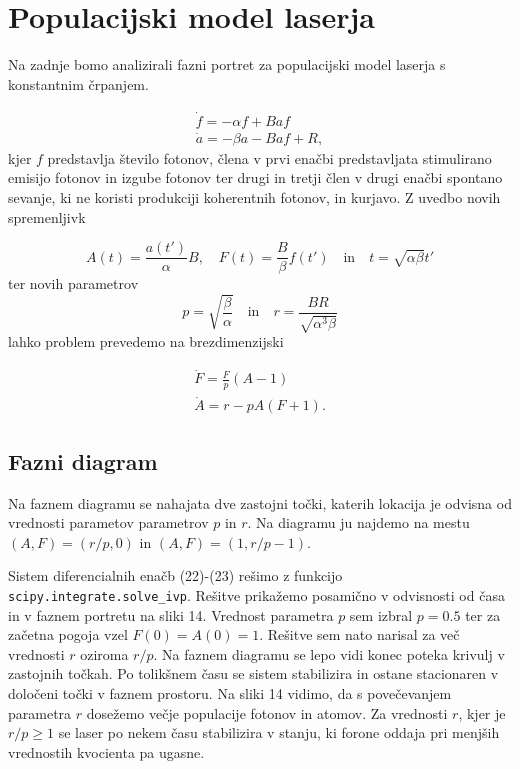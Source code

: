 \documentclass[slovene,11pt,a4paper]{article}
\begin{document}
\section{Populacijski model laserja}

Na zadnje bomo analizirali fazni portret za populacijski model laserja s konstantnim črpanjem.

\begin{align}
\dot{f} = -\alpha f + B af \\
\dot{a} = -\beta a - B af + R,
\end{align}
kjer $f$ predstavlja število fotonov, člena v prvi enačbi predstavljata stimulirano emisijo fotonov in izgube fotonov ter drugi in tretji člen v drugi enačbi spontano sevanje, ki ne koristi produkciji koherentnih fotonov, in kurjavo. Z uvedbo novih spremenljivk

\[
A(t) = \frac{a(t')}{\alpha} B, \quad F(t) = \frac{B}{\beta} f(t') \quad \text{in} \quad t = \sqrt{\alpha \beta} t'
\]
ter novih parametrov
\[
p = \sqrt{\frac{\beta}{\alpha}} \quad \text{in} \quad r = \frac{BR}{\sqrt{\alpha^3 \beta}}
\]
lahko problem prevedemo na brezdimenzijski

\begin{align}
\dot{F} = \frac{F}{p}(A-1) \\
\dot{A} = r - pA(F+1).
\end{align}

\subsection{Fazni diagram}

Na faznem diagramu se nahajata dve zastojni točki, katerih lokacija je odvisna od vrednosti parametov parametrov $p$ in $r$. Na diagramu ju najdemo na mestu $(A,F) = (r/p, 0)$ in $(A,F) = (1, r/p -1)$.

Sistem diferencialnih enačb (22)-(23) rešimo z funkcijo \texttt{scipy.integrate.solve\_ivp}. Rešitve prikažemo posamično v odvisnosti od časa in v faznem portretu na sliki 14. Vrednost parametra $p$ sem izbral $p=0.5$ ter za začetna pogoja vzel $F(0)=A(0)=1$. Rešitve sem nato narisal za več vrednosti $r$ oziroma $r/p$. Na faznem diagramu se lepo vidi konec poteka krivulj v zastojnih točkah. Po tolikšnem času se sistem stabilizira in ostane stacionaren v določeni točki v faznem prostoru. Na sliki 14 vidimo, da s povečevanjem parametra $r$ dosežemo večje populacije fotonov in atomov. Za vrednosti $r$, kjer je $r/p \geq 1$ se laser po nekem času stabilizira v stanju, ki forone oddaja pri menjših vrednostih kvocienta pa ugasne.
\end{document}
